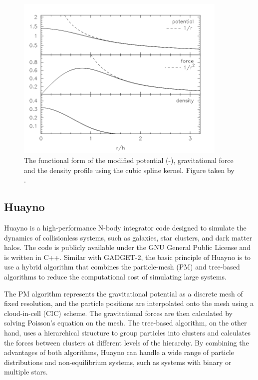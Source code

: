 \begin{figure}[H]
    \centering
    \includegraphics[width=0.9\textwidth]{Thesis/figures/smoothening.pdf}
    \caption{The functional form of the modified potential (-), gravitational force and the density profile using the cubic spline kernel. Figure taken by \cite{price2007energy}.}
    \label{fig:smoothened_gravity}
\end{figure}

\subsection{Huayno}

Huayno \citep{pelupessy2012n} is a high-performance N-body integrator code designed to simulate the dynamics of collisionless systems, such as galaxies, star clusters, and dark matter halos. The code is publicly available under the GNU General Public License and is written in C++. Similar with GADGET-2, the basic principle of Huayno is to use a hybrid algorithm \citep{bode2000tree} that combines the particle-mesh (PM) \citep{klypin1983three} and tree-based algorithms \citep{barnes1986hierarchical,dehnen2000very} to reduce the computational cost of simulating large systems.


The PM algorithm represents the gravitational potential as a discrete mesh of fixed resolution, and the particle positions are interpolated onto the mesh using a cloud-in-cell (CIC) scheme. The gravitational forces are then calculated by solving Poisson's equation on the mesh. The tree-based algorithm, on the other hand, uses a hierarchical structure to group particles into clusters and calculates the forces between clusters at different levels of the hierarchy. By combining the advantages of both algorithms, Huayno can handle a wide range of particle distributions and non-equilibrium systems, such as systems with binary or multiple stars.


